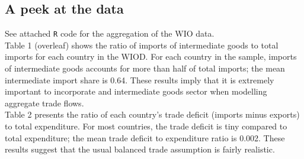 \documentclass[12pt]{article}
\begin{document}
\subsection{A peek at the data}
See attached \verb|R| code for the aggregation of the WIO data.\\

Table 1 (overleaf) shows the ratio of imports of intermediate goods to total imports for each country in the WIOD. For each country in the sample, imports of intermediate goods accounts for more than half of total imports; the mean intermediate import share is 0.64. These results imply that it is extremely important to incorporate and intermediate goods sector when modelling aggregate trade flows.\\

Table 2 presents the ratio of each country's trade deficit (imports minus exports) to total expenditure. For most countries, the trade deficit is tiny compared to total expenditure; the mean trade deficit to expenditure ratio is 0.002. These results suggest that the usual balanced trade assumption is fairly realistic.
\end{document}
